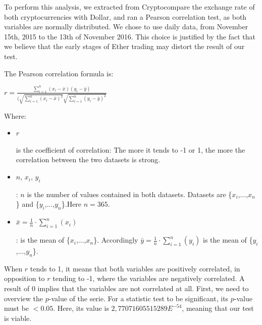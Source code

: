 \documentclass[11pt]{report}
\begin{document}
To perform this analysis, we extracted from Cryptocompare the exchange rate of both cryptocurrencies with Dollar, and ran a Pearson correlation test, as both variables are normally distributed. We chose to use daily data, from November 15th, 2015 to the 13th of November 2016. This choice is justified by the fact that we believe that the early stages of Ether trading may distort the result of our test.

The Pearson correlation formula is: \medbreak

\begin{center}
\begin{Large}
$r = \frac{\sum_{i=1}^{n}  (x_i-\bar{x})(y_i-\bar{y})}{(\sqrt{\sum_{i=1}^{n} (x_i-\bar{x})^2} \sqrt{\sum_{i=1}^{n} (y_i-\bar{y})^2}}$
\end{Large}
\end{center}

Where:
\smallbreak
\begin{itemize}

\item \begin{Large}$r$\end{Large} is the coefficient of correlation: The more it tends to -1 or 1, the more the correlation between the two datasets is strong.

\smallbreak

\item \begin{Large} $n${,} $x_i${,} $y_i$\end{Large}: $n$ is the number of values contained in both datasets. Datasets are \{$x_i$,...,$x_n$\} and \{$y_i$,...,$y_n$\}.Here $ n= 365$.

\smallbreak

\item \begin{Large} $\bar{x}= \frac{1}{n} \cdot \sum_{i=1}^{n} (x_i)$ \end{Large}: is the mean of \{$x_i$,...,$x_n$\}. 
\newline Accordingly $\bar{y}= \frac{1}{n} \cdot \sum_{i=1}^{n} (y_i)$ is the mean of \{$y_i$,...,$y_n$\}.
\end{itemize} 

 When $r$ tends to 1, it means that both variables are positively correlated, in opposition to $r$ tending to -1, where the variables are negatively correlated. A result of 0 implies that the variables are not correlated at all. \newline First, we need to overview the $p$-value of the serie. For a statistic test to be significant, its $p$-value must be  $<0.05$. Here, its value is $2,77071605515289E^{-54}$, meaning that our test is viable.\clearpage
 
\end{document}
